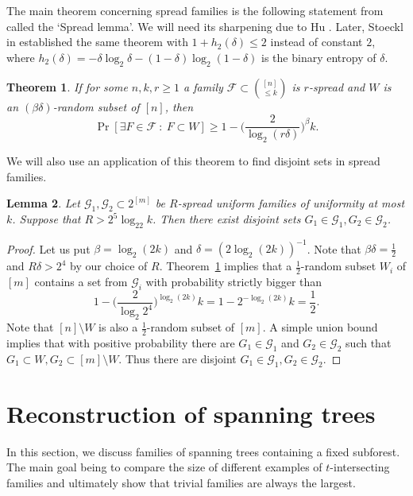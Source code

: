 \documentclass[11pt,letterpaper]{amsart}
\renewcommand{\le}{\leqslant}
\renewcommand{\ge}{\geqslant}
\newcommand{\ff}{\mathcal{F}}
\newcommand{\g}{\mathcal{G}}
\newtheorem{theorem}{Theorem}
\newtheorem{lemma}[theorem]{Lemma}
\begin{document}
The main theorem concerning spread families is the following statement from \cite{Alw} called the `Spread lemma'. We will need its sharpening due to Hu \cite{Hu}. Later, Stoeckl in \cite{Sto} established the same theorem  with $1 + h_2(\delta) \le 2$ instead of constant $2$, where $h_2(\delta) = -\delta \log_2 \delta -(1 - \delta) \log_2(1 - \delta)$ is the binary entropy of $\delta$.

\begin{theorem}\label{spread_lemma}
  If for some $n,k,r\ge 1$ a family $\ff\subset {[n]\choose \le k}$ is $r$-spread and $W$ is an $(\beta\delta)$-random subset of $[n]$, then $$\Pr[\exists F\in \ff\ :\ F\subset W]\ge 1-\Big(\frac 2{\log_2(r\delta)} \Big)^\beta k.$$
\end{theorem}

We will also use an application of this theorem to find disjoint sets in spread families.

\begin{lemma}\label{find_disjoint}
Let $\g_1, \g_2 \subset 2^{[m]}$ be $R$-spread uniform families of uniformity at most $k$. Suppose that $R>2^{5}\log_22k$. Then there exist disjoint sets $G_1 \in \g_1, G_2 \in \g_2$.
\end{lemma}

\begin{proof}
Let us put $\beta= \log_2(2k)$ and $\delta = (2\log_2(2k))^{-1}$. Note that $\beta\delta = \frac 12$ and $R\delta > 2^{4}$ by our choice of $R$. Theorem~\ref{spread_lemma} implies that a $\frac{1}2$-random subset $W_i$ of $[m]$ contains a set from $\g_i$ with probability strictly bigger than
$$1-\Big(\frac 2{\log_2 2^{4}}\Big)^{\log_2 (2k)} k = 1-2^{-\log_2 (2k)} k = \frac 12.$$
Note that $[n]\setminus W$ is also a $\frac12$-random subset of $[m]$. A simple union bound implies that with positive probability there are $G_1 \in \g_1$ and $G_2 \in \g_2$ such that $G_1 \subset W, G_2 \subset [m]\setminus W$. Thus there are disjoint $G_1 \in \g_1, G_2 \in \g_2$.
\end{proof}

\section{Reconstruction of spanning trees}\label{sec3}
In this section, we discuss families of spanning trees containing a fixed subforest. The main goal being to compare the size of different examples of $t$-intersecting families and ultimately show that trivial families are always the largest. 
\end{document}
